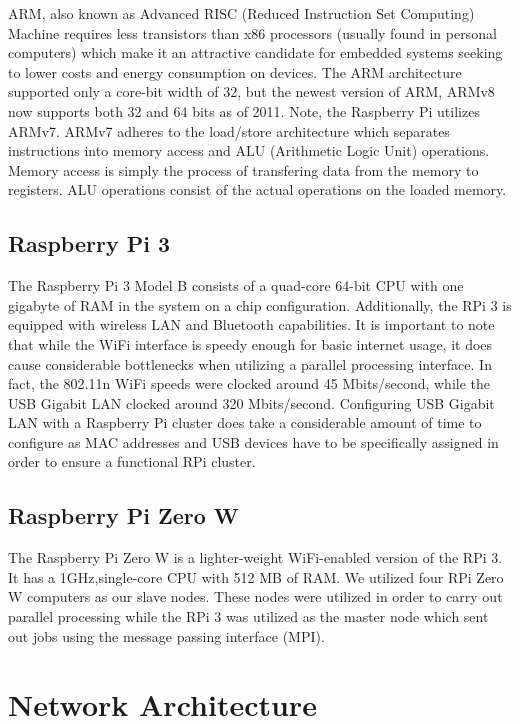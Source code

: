	ARM, also known as Advanced RISC (Reduced Instruction Set Computing) Machine requires less transistors than x86 processors (usually found in personal computers) which make it an attractive candidate for embedded systems seeking to lower costs and energy consumption on devices. The ARM architecture supported only a core-bit width of 32, but the newest version of ARM, ARMv8 now supports both 32 and 64 bits as of 2011. Note, the Raspberry Pi utilizes ARMv7. ARMv7 adheres to the load/store architecture which separates instructions into memory access and ALU (Arithmetic Logic Unit) operations. Memory access is simply the process of transfering data from the memory to registers. ALU operations consist of the actual operations on the loaded memory. 

\subsection{Raspberry Pi 3}
	The Raspberry Pi 3 Model B consists of a quad-core 64-bit CPU with one gigabyte of RAM in the system on a chip configuration. Additionally, the RPi 3 is equipped with wireless LAN and Bluetooth capabilities. It is important to note that while the WiFi interface is speedy enough for basic internet usage, it does cause considerable bottlenecks when utilizing a parallel processing interface. In fact, the 802.11n WiFi speeds were clocked around 45 Mbits/second, while the USB Gigabit LAN clocked around 320 Mbits/second. Configuring USB Gigabit LAN with a Raspberry Pi cluster does take a considerable amount of time to configure as MAC addresses and USB devices have to be specifically assigned in order to ensure a functional RPi cluster. 

\subsection{Raspberry Pi Zero W}
	The Raspberry Pi Zero W is a lighter-weight WiFi-enabled version of the RPi 3. It has a 1GHz,single-core CPU with 512 MB of RAM. We utilized four RPi Zero W computers as our slave nodes. These nodes were utilized in order to carry out parallel processing while the RPi 3 was utilized as the master node which sent out jobs using the message passing interface (MPI). 

\section{Network Architecture}

